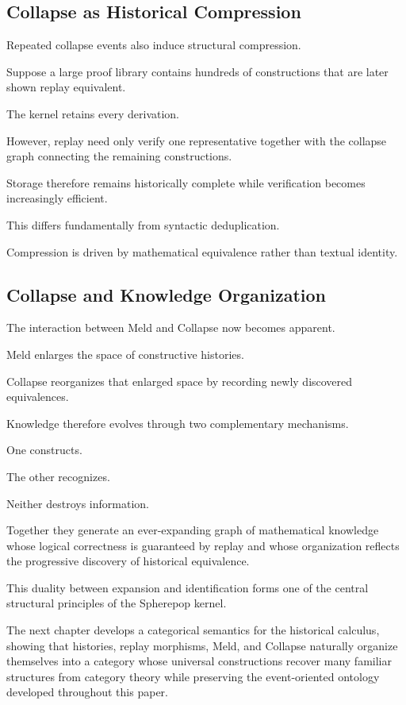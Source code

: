 \documentclass[12pt,oneside]{article}
\theoremstyle{definition}
\theoremstyle{remark}
\begin{document}
\subsection{Collapse as Historical Compression}

Repeated collapse events also induce structural compression.

Suppose a large proof library contains hundreds of constructions that are later
shown replay equivalent.

The kernel retains every derivation.

However, replay need only verify one representative together with the collapse
graph connecting the remaining constructions.

Storage therefore remains historically complete while verification becomes
increasingly efficient.

This differs fundamentally from syntactic deduplication.

Compression is driven by mathematical equivalence rather than textual identity.

\subsection{Collapse and Knowledge Organization}

The interaction between Meld and Collapse now becomes apparent.

Meld enlarges the space of constructive histories.

Collapse reorganizes that enlarged space by recording newly discovered
equivalences.

Knowledge therefore evolves through two complementary mechanisms.

One constructs.

The other recognizes.

Neither destroys information.

Together they generate an ever-expanding graph of mathematical knowledge whose
logical correctness is guaranteed by replay and whose organization reflects the
progressive discovery of historical equivalence.

This duality between expansion and identification forms one of the central
structural principles of the Spherepop kernel.

The next chapter develops a categorical semantics for the historical calculus,
showing that histories, replay morphisms, Meld, and Collapse naturally organize
themselves into a category whose universal constructions recover many familiar
structures from category theory while preserving the event-oriented ontology
developed throughout this paper.
\end{document}
